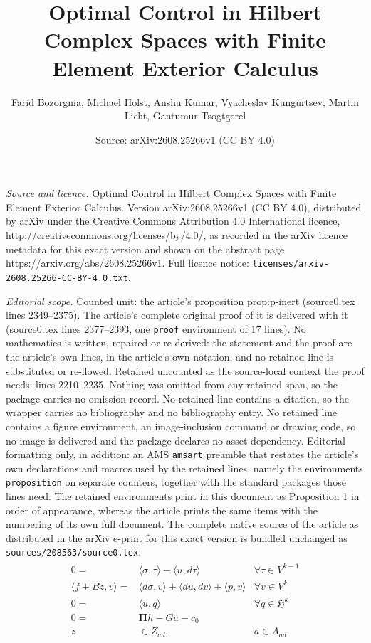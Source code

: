 \documentclass[10pt,a4paper]{amsart}
\title{Optimal Control in Hilbert Complex Spaces with Finite Element Exterior Calculus}
\author{Farid Bozorgnia, Michael Holst, Anshu Kumar, Vyacheslav Kungurtsev, Martin Licht, Gantumur Tsogtgerel}
\date{Source: arXiv:2608.25266v1 (CC BY 4.0)}
\newcommand{\Piop}{\boldsymbol\Pi}
\begin{document}
\maketitle

\noindent\emph{Source and licence.} Optimal Control in Hilbert Complex Spaces with Finite Element Exterior Calculus. Version arXiv:2608.25266v1 (CC BY 4.0), distributed by arXiv under the Creative Commons Attribution 4.0 International licence, http://creativecommons.org/licenses/by/4.0/, as recorded in the arXiv licence metadata for this exact version and shown on the abstract page https://arxiv.org/abs/2608.25266v1. Full licence notice: \texttt{licenses/arxiv-2608.25266-CC-BY-4.0.txt}.\par\smallskip

\noindent\textit{Editorial scope.} Counted unit: the article's proposition prop:p-inert (source0.tex lines 2349--2375). The article's complete original proof of it is delivered with it (source0.tex lines 2377--2393, one \texttt{proof} environment of 17 lines). No mathematics is written, repaired or re-derived: the statement and the proof are the article's own lines, in the article's own notation, and no retained line is substituted or re-flowed.  Retained uncounted as the source-local context the proof needs: lines 2210--2235.  Nothing was omitted from any retained span, so the package carries no omission record.  No retained line contains a citation, so the wrapper carries no bibliography and no bibliography entry.  No retained line contains a figure environment, an image-inclusion command or drawing code, so no image is delivered and the package declares no asset dependency.  Editorial formatting only, in addition: an AMS \texttt{amsart} preamble that restates the article's own declarations and macros used by the retained lines, namely the environments \texttt{proposition} on separate counters, together with the standard packages those lines need.  The retained environments print in this document as Proposition 1 in order of appearance, whereas the article prints the same items with the numbering of its own full document.  The complete native source of the article as distributed in the arXiv e-print for this exact version is bundled unchanged as \texttt{sources/208563/source0.tex}.
\begin{align}\label{eq:pdeconlaplace:constraints}
	\begin{array}{rll}
		0
		=
		 &
		\langle \sigma, \tau \rangle - \langle u, d \tau \rangle
		 &
		\forall \tau \in V^{k-1}
		\\
		\langle f+Bz,v \rangle
		=
		 &
		\langle d\sigma,v \rangle + \langle du,dv \rangle + \langle p,v \rangle
		 &
		\forall v \in V^k
		\\
		0 =
		 &
		\langle u, q \rangle
		 &
		\forall q \in \mathfrak H^k
		\\
        0 = & \Piop h-Ga-c_0 \\
        z & \in Z_{ad}, & a\in A_{ad}
	\end{array}
\end{align}
\end{document}

